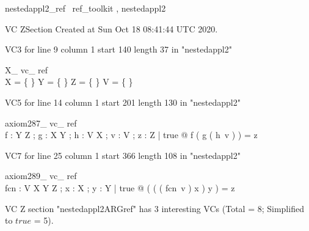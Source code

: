 \documentclass{article}
\begin{document}

\begin{zsection}	 \SECTION nestedappl2\_ref \parents~ref\_toolkit , nestedappl2
\end{zsection}

VC ZSection Created at Sun Oct 18 08:41:44 UTC 2020.

VC3 for line 9 column 1 start 140 length 37 in "nestedappl2"
\begin{theorem}{ X\_ vc\_ ref}\\
 \lnot X = \{ \} \land \lnot Y = \{ \} \land \lnot Z = \{ \} \land \lnot V = \{ \} \\

\end{theorem}

VC5 for line 14 column 1 start 201 length 130 in "nestedappl2"
\begin{theorem}{ axiom287\_ vc\_ ref}\\
 \exists f : Y \pfun Z ; g : X \pfun Y ; h : V \pfun X ; v : V ; z : Z | true @ f ( g ( h~v ) ) = z \\

\end{theorem}

VC7 for line 25 column 1 start 366 length 108 in "nestedappl2"
\begin{theorem}{ axiom289\_ vc\_ ref}\\
 \exists fcn : V \pfun X \pfun Y \pfun Z ; x : X ; y : Y | true @ ( ( ( fcn~v ) x ) y ) = z \\

\end{theorem}



 VC Z section "nestedappl2ARGref" has $3$ interesting VCs (Total = 8; Simplified to $true$ = 5).



\end{document}
